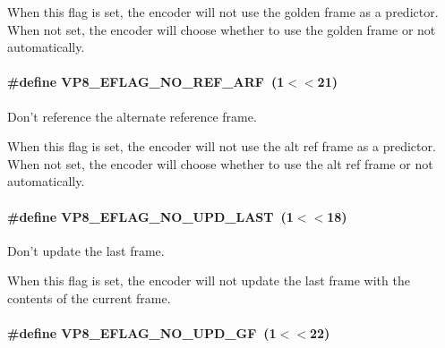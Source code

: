 When this flag is set, the encoder will not use the golden frame as a predictor. When not set, the encoder will choose whether to use the golden frame or not automatically. \hypertarget{group__vp8__encoder_ga650ab0baea12be91082226a5cc18776a}{
\paragraph[{V\+P8\+\_\+\+E\+F\+L\+A\+G\+\_\+\+N\+O\+\_\+\+R\+E\+F\+\_\+\+A\+R\+F}]{\setlength{\rightskip}{0pt plus 5cm}\#define V\+P8\+\_\+\+E\+F\+L\+A\+G\+\_\+\+N\+O\+\_\+\+R\+E\+F\+\_\+\+A\+R\+F~(1$<$$<$21)}}\label{group__vp8__encoder_ga650ab0baea12be91082226a5cc18776a}


Don't reference the alternate reference frame. 

When this flag is set, the encoder will not use the alt ref frame as a predictor. When not set, the encoder will choose whether to use the alt ref frame or not automatically. \hypertarget{group__vp8__encoder_ga602edb6b02a89cb2db7a16d6dffba583}{
\paragraph[{V\+P8\+\_\+\+E\+F\+L\+A\+G\+\_\+\+N\+O\+\_\+\+U\+P\+D\+\_\+\+L\+A\+S\+T}]{\setlength{\rightskip}{0pt plus 5cm}\#define V\+P8\+\_\+\+E\+F\+L\+A\+G\+\_\+\+N\+O\+\_\+\+U\+P\+D\+\_\+\+L\+A\+S\+T~(1$<$$<$18)}}\label{group__vp8__encoder_ga602edb6b02a89cb2db7a16d6dffba583}


Don't update the last frame. 

When this flag is set, the encoder will not update the last frame with the contents of the current frame. \hypertarget{group__vp8__encoder_gab01d066c5236457d345ce1cab4c41d6b}{
\paragraph[{V\+P8\+\_\+\+E\+F\+L\+A\+G\+\_\+\+N\+O\+\_\+\+U\+P\+D\+\_\+\+G\+F}]{\setlength{\rightskip}{0pt plus 5cm}\#define V\+P8\+\_\+\+E\+F\+L\+A\+G\+\_\+\+N\+O\+\_\+\+U\+P\+D\+\_\+\+G\+F~(1$<$$<$22)}}\label{group__vp8__encoder_gab01d066c5236457d345ce1cab4c41d6b}


